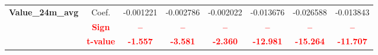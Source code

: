 \documentclass[11pt,english,a4paper,hidelinks]{book}
\begin{document}
\begin{table}[H]
\begin{tabular}{lccccccc}
        \multirow{3}{*}{\textbf{Value\_24m\_avg}} 
            & Coef.   & -0.001221 & -0.002786 & -0.002022 & -0.013676 & -0.026588 & -0.013843 \\
            & \textbf{\textcolor{red}{Sign}}    & \textbf{\textcolor{red}{–}}         & \textbf{\textcolor{red}{–}}         & \textbf{\textcolor{red}{–}}         & \textbf{\textcolor{red}{–}}         & \textbf{\textcolor{red}{–}}         & \textbf{\textcolor{red}{–}}         \\
            & \textbf{\textcolor{red}{t-value}} & \textbf{\textcolor{red}{-1.557}}    & \textbf{\textcolor{red}{-3.581}}    & \textbf{\textcolor{red}{-2.360}}    & \textbf{\textcolor{red}{-12.981}}   & \textbf{\textcolor{red}{-15.264}}   & \textbf{\textcolor{red}{-11.707}}   \\
        \bottomrule
    \end{tabular}
    \label{tab:asia_oceania_windowed_consistency_summary}
\end{table}
\end{document}

